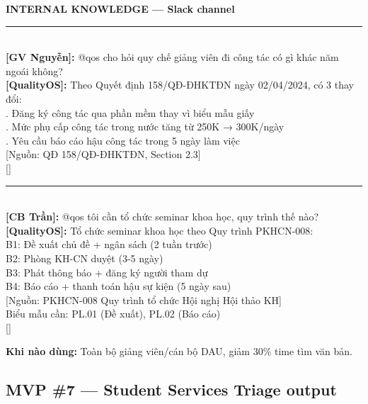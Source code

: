 \documentclass[11pt,a4paper]{article}
\begin{document}
\begin{mockbox}
{\bfseries\color{ink} INTERNAL KNOWLEDGE --- Slack channel}\\[6pt]
\rule{\linewidth}{0.3pt}\\[4pt]
{\bfseries [GV Nguyễn]:} @qos cho hỏi quy chế giảng viên đi công tác có gì khác năm ngoái không?\\[4pt]
{\bfseries\color{leaf} [QualityOS]:} Theo Quyết định 158/QĐ-ĐHKTĐN ngày 02/04/2024, có 3 thay đổi:\\
. Đăng ký công tác qua phần mềm thay vì biểu mẫu giấy\\
. Mức phụ cấp công tác trong nước tăng từ 250K → 300K/ngày\\
. Yêu cầu báo cáo hậu công tác trong 5 ngày làm việc\\[2pt]
\textcolor{mid}{[Nguồn: QĐ 158/QĐ-ĐHKTĐN, Section 2.3]}\\[2pt]
{[]  }\\[6pt]
\rule{\linewidth}{0.3pt}\\[4pt]
{\bfseries [CB Trần]:} @qos tôi cần tổ chức seminar khoa học, quy trình thế nào?\\[4pt]
{\bfseries\color{leaf} [QualityOS]:} Tổ chức seminar khoa học theo Quy trình PKHCN-008:\\
\quad B1: Đề xuất chủ đề + ngân sách (2 tuần trước)\\
\quad B2: Phòng KH-CN duyệt (3-5 ngày)\\
\quad B3: Phát thông báo + đăng ký người tham dự\\
\quad B4: Báo cáo + thanh toán hậu sự kiện (5 ngày sau)\\[2pt]
\textcolor{mid}{[Nguồn: PKHCN-008 Quy trình tổ chức Hội nghị Hội thảo KH]}\\
\textcolor{mid}{Biểu mẫu cần: PL.01 (Đề xuất), PL.02 (Báo cáo)}\\
{[]}
\end{mockbox}

\textbf{Khi nào dùng:} Toàn bộ giảng viên/cán bộ DAU, giảm 30\% time tìm văn bản.

\subsection{MVP \#7 --- Student Services Triage output}
\end{document}
